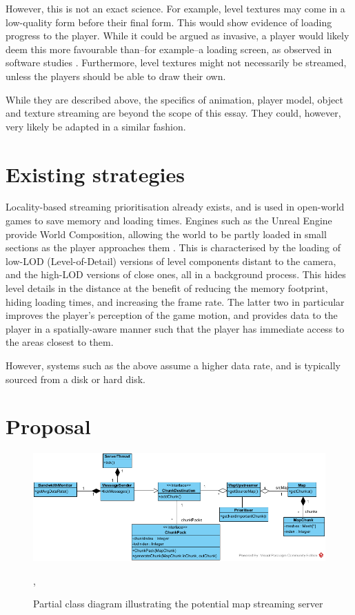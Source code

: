 \documentclass{scrartcl}
\begin{document}
However, this is not an exact science. For example, level textures may come in a low-quality form before their final form. This would show evidence of loading progress to the player. While it could be argued as invasive, a player would likely deem this more favourable than--for example--a loading screen, as observed in software studies \cite{loadingscreens}. Furthermore, level textures might not necessarily be streamed, unless the players should be able to draw their own.

While they are described above, the specifics of animation, player model, object and texture streaming are beyond the scope of this essay. They could, however, very likely be adapted in a similar fashion.

\section{Existing strategies}
Locality-based streaming prioritisation already exists, and is used in open-world games to save memory and loading times. Engines such as the Unreal Engine provide World Composition, allowing the world to be partly loaded in small sections as the player approaches them \cite{unrealcomposition}. This is characterised by the loading of low-LOD (Level-of-Detail) versions of level components distant to the camera, and the high-LOD versions of close ones, all in a background process. This hides level details in the distance at the benefit of reducing the memory footprint, hiding loading times, and increasing the frame rate. The latter two in particular improves the player's perception of the game motion, and provides data to the player in a spatially-aware manner such that the player has immediate access to the areas closest to them.

However, systems such as the above assume a higher data rate, and is typically sourced from a disk or hard disk. 

\section{Proposal}
\begin{figure}[H]
	\centering
	\includegraphics[width=0.7\linewidth]{Server_Side_Streamer.png}
	\caption{Partial class diagram illustrating the potential map streaming server},
	\label{fig:serversystem}
\end{figure}
\end{document}
